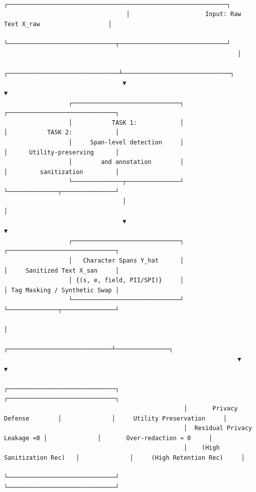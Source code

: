 \documentclass[
  11pt,
  a4paper,
]{article}
\begin{document}
\begin{verbatim}
                                  ┌─────────────────────────────────────────────────────────────┐
                                  │                     Input: Raw Text X_raw                   │
                                  └──────────────────────────────┬──────────────────────────────┘
                                                                 │
                                 ┌───────────────────────────────┴──────────────────────────────┐
                                 ▼                                                              ▼
                  ┌──────────────────────────────┐                              ┌──────────────────────────────┐
                  │           TASK 1:            │                              │           TASK 2:            │
                  │     Span-level detection     │                              │      Utility-preserving      │
                  │        and annotation        │                              │         sanitization         │
                  └──────────────┬───────────────┘                              └──────────────┬───────────────┘
                                 │                                                             │
                                 ▼                                                             ▼
                  ┌──────────────────────────────┐                              ┌──────────────────────────────┐
                  │   Character Spans Y_hat      │                              │     Sanitized Text X_san     │
                  │ {(s, e, field, PII/SPI)}     │                              │ Tag Masking / Synthetic Swap │
                  └──────────────────────────────┘                              └──────────────┬───────────────┘
                                                                                               │
                                                                 ┌─────────────────────────────┴───────────────┐
                                                                 ▼                                             ▼
                                                  ┌──────────────────────────────┐              ┌──────────────────────────────┐
                                                  │       Privacy Defense        │              │     Utility Preservation     │
                                                  │  Residual Privacy Leakage ≈0 │              │       Over-redaction ≈ 0     │
                                                  │    (High Sanitization Rec)   │              │     (High Retention Rec)     │
                                                  └──────────────────────────────┘              └──────────────────────────────┘
\end{verbatim}
\end{document}
